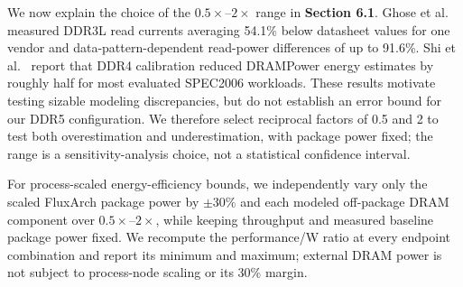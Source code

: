 We now explain the choice of the $0.5\times$--$2\times$ range in \textbf{Section 6.1}. Ghose et al.~ measured DDR3L read currents averaging 54.1\% below datasheet values for one vendor and data-pattern-dependent read-power differences of up to 91.6\%. Shi et al.~ report that DDR4 calibration reduced DRAMPower energy estimates by roughly half for most evaluated SPEC2006 workloads. These results motivate testing sizable modeling discrepancies, but do not establish an error bound for our DDR5 configuration. We therefore select reciprocal factors of 0.5 and 2 to test both overestimation and underestimation, with package power fixed; the range is a sensitivity-analysis choice, not a statistical confidence interval.

For process-scaled energy-efficiency bounds, we independently vary only the scaled FluxArch package power by $\pm30\%$ and each modeled off-package DRAM component over $0.5\times$--$2\times$, while keeping throughput and measured baseline package power fixed. We recompute the performance/W ratio at every endpoint combination and report its minimum and maximum; external DRAM power is not subject to process-node scaling or its 30\% margin.



\par
\begin{manuscriptexcerpt}
   

\end{manuscriptexcerpt}


